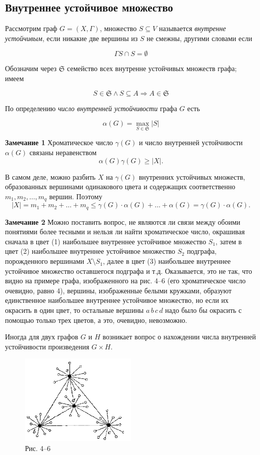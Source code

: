 \subsection{Внутреннее устойчивое множество}

Рассмотрим граф $G = (X, \Gamma)$, множество $S \subseteq V$ называется \textit{внутренне устойчивым}, если никакие две вершины из $S$ не смежны, другими словами если

\[
\Gamma S \cap S = \emptyset
\]

Обозначим через $\mathfrak{S}$ семейство всех внутренне устойчивых множеств графа; имеем

\[
S \in \mathfrak{S} \land S \subseteq A \Rightarrow A \in \mathfrak{S}
\]

По определению \textit{число внутренней устойчивости} графа $G$ есть

\[
\alpha(G) = \max_{S \in \mathfrak{S}} |S|
\]

\textbf{Замечание 1} Хроматическое число $\gamma(G)$ и число внутренней устойчивости $\alpha(G)$ связаны неравенством
\[
\alpha(G) \gamma(G) \geq |X|.
\]

В самом деле, можно разбить $X$ на $\gamma(G)$ внутренних устойчивых множеств, образованных вершинами одинакового цвета и содержащих соответственно $m_1, m_2, \ldots, m_q$ вершин. Поэтому
\[
|X| = m_1 + m_2 + \ldots + m_q \leq \gamma(G) \cdot \alpha(G) + \ldots + \alpha(G) = \gamma(G) \cdot \alpha(G).
\]

\textbf{Замечание 2} Можно поставить вопрос, не являются ли связи между обоими понятиями более тесными и нельзя ли найти хроматическое число, окрашивая сначала в цвет (1) наибольшее внутреннее устойчивое множество $S_1$, затем в цвет (2) наибольшее внутреннее устойчивое множество $S_2$ подграфа, порожденного вершинами $X \setminus S_1$, далее в цвет (3) наибольшее внутреннее устойчивое множество оставшегося подграфа и т.д. Оказывается, это не так, что видно на примере графа, изображенного на рис. 4--6 (его хроматическое число очевидно, равно 4), вершины, изображенные белыми кружками, образуют единственное наибольшее внутреннее устойчивое множество, но если их окрасить в один цвет, то остальные вершины $a \, b \, c \, d$ надо было бы окрасить с помощью только трех цветов, а это, очевидно, невозможно.

Иногда для двух графов $G$ и $H$ возникает вопрос о нахождении числа внутренней устойчивости произведения $G \times H$.

\begin{figure}[h]
    \centering
    \includegraphics[width=0.5\textwidth]{example-imageю.png} %
    \caption{Рис. 4--6}
\end{figure}


